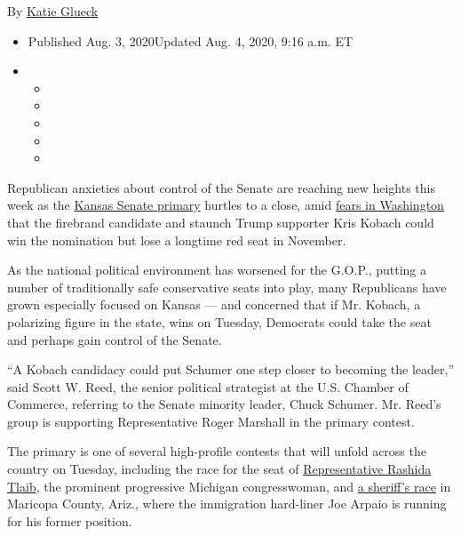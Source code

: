 By \href{https://www.nytimes3xbfgragh.onion/by/katie-glueck}{Katie
Glueck}

\begin{itemize}
\item
  Published Aug. 3, 2020Updated Aug. 4, 2020, 9:16 a.m. ET
\item
  \begin{itemize}
  \item
  \item
  \item
  \item
  \item
  \end{itemize}
\end{itemize}

Republican anxieties about control of the Senate are reaching new
heights this week as the
\href{https://www.nytimes3xbfgragh.onion/2020/08/04/us/elections/primary-election-michigan-arizona-kansas.html}{Kansas
Senate primary} hurtles to a close, amid
\href{https://www.nytimes3xbfgragh.onion/2020/07/30/us/politics/kansas-senate-kobach-trump.html}{fears
in Washington} that the firebrand candidate and staunch Trump supporter
Kris Kobach could win the nomination but lose a longtime red seat in
November.

As the national political environment has worsened for the G.O.P.,
putting a number of traditionally safe conservative seats into play,
many Republicans have grown especially focused on Kansas --- and
concerned that if Mr. Kobach, a polarizing figure in the state, wins on
Tuesday, Democrats could take the seat and perhaps gain control of the
Senate.

``A Kobach candidacy could put Schumer one step closer to becoming the
leader,'' said Scott W. Reed, the senior political strategist at the
U.S. Chamber of Commerce, referring to the Senate minority leader, Chuck
Schumer. Mr. Reed's group is supporting Representative Roger Marshall in
the primary contest.

The primary is one of several high-profile contests that will unfold
across the country on Tuesday, including the race for the seat of
\href{https://www.nytimes3xbfgragh.onion/2020/07/18/us/rashida-tlaib-brenda-jones-primary.html}{Representative
Rashida Tlaib}, the prominent progressive Michigan congresswoman, and
\href{https://www.nytimes3xbfgragh.onion/2020/08/02/us/politics/arizona-election-joe-arpaio.html}{a
sheriff's race} in Maricopa County, Ariz., where the immigration
hard-liner Joe Arpaio is running for his former position.


